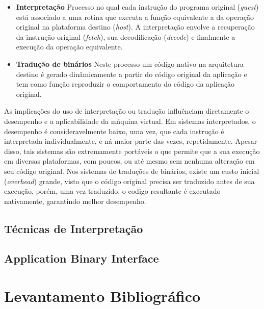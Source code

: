 \documentclass[11pt,twoside]{article}
\begin{document}
\begin{itemize}
 \item \textbf{Interpretação} Processo no qual cada instrução do programa original (\emph{guest}) está associado a uma rotina que executa a função equivalente a da operação original na plataforma destino (\emph{host}).
A interpretação envolve a recuperação da instrução original (\emph{fetch}), sua decodificação (\emph{decode}) e finalmente a execução da operação equivalente.
 \item \textbf{Tradução de binários} Neste processo um código nativo na arquitetura destino é gerado dinâmicamente a partir do código original da aplicação e tem como função reproduzir o comportamento do código da aplicação original\cite{Sites1993}. 
\end{itemize}

As implicações do uso de interpretação ou tradução influênciam diretamente o desempenho e a aplicabilidade da máquina virtual.
Em sistemas interpretados, o desempenho é consideravelmente baixo, uma vez, que cada instrução é interpretada individualmente, e ná maior parte das vezes, repetidamente.
Apesar disso, tais sistemas são extremamente portáveis o que permite que a sua execução em diversas plataformas, com poucos, ou até mesmo sem nenhuma alteração em seu código original.
Nos sistemas de traduções de binários, existe um custo inicial (\emph{overhead}) grande, visto que o código original precisa ser traduzido antes de sua execução, porém, uma vez traduzido, o codigo resultante é executado nativamente, garantindo melhor desempenho.

 \subsection{Técnicas de Interpretação}

 \subsection{Application Binary Interface}

\section{Levantamento Bibliográfico}
\end{document}
